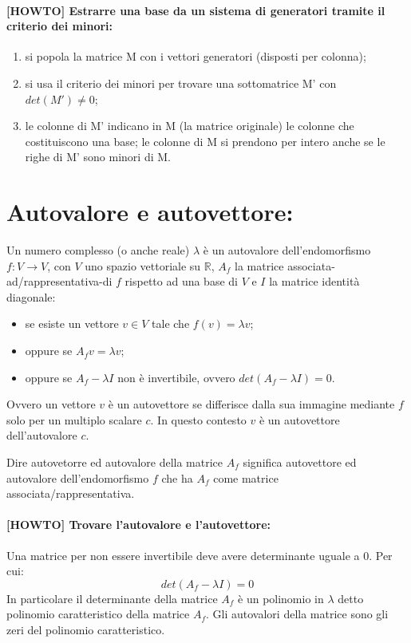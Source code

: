 \documentclass[a4paper]{article}
\begin{document}
        \paragraph{[HOWTO] Estrarre una base da un sistema di generatori tramite il criterio dei minori:}
        \begin{enumerate}
                \item si popola la matrice M con i vettori generatori (disposti per colonna);
                \item si usa il criterio dei minori per trovare una sottomatrice M' con $det(M') \neq 0$;
                \item le colonne di M' indicano in M (la matrice originale) le colonne che costituiscono una base; le colonne di M si prendono per intero anche se le righe di M' sono minori di M.
        \end{enumerate}


        \section*{Autovalore e autovettore:}
        Un numero complesso (o anche reale) $\lambda$ \`{e} un autovalore dell'endomorfismo $f: V \rightarrow V $, con $V$ uno spazio vettoriale su $\mathbb{R}$, $A_{f}$ la matrice associata-ad/rappresentativa-di $f$ rispetto ad una base di $V$ e $I$ la matrice identit\`{a} diagonale:
        \begin{itemize}
                \item se esiste un vettore $v \in V$ tale che $f(v) = \lambda v$;
                \item oppure se $A_{f}v = \lambda v$;
                \item oppure se $A_{f} - \lambda I$ non \`{e} invertibile, ovvero $det(A_{f} - \lambda I) = 0$.
        \end{itemize}

        Ovvero un vettore $v$ \`{e} un autovettore se differisce dalla sua immagine mediante $f$ solo per un multiplo scalare $c$.
        In questo contesto $v$ \`{e} un autovettore dell'autovalore $c$.

        Dire autovetorre ed autovalore della matrice $A_{f}$ significa autovettore ed autovalore dell'endomorfismo $f$ che ha $A_{f}$ come matrice associata/rappresentativa.

        \paragraph{[HOWTO] Trovare l'autovalore e l'autovettore:}
        Una matrice per non essere invertibile deve avere determinante uguale a $0$. Per cui:
        \[ det(A_{f} - \lambda I) = 0 \]
        In particolare il determinante della matrice $A_{f}$ \`{e} un polinomio in $\lambda$ detto polinomio caratteristico della matrice $A_{f}$. Gli autovalori della matrice sono gli zeri del polinomio caratteristico.
\end{document}
